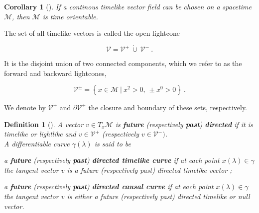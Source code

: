 \documentclass[11pt]{book}
\newcommand{\Mcal}{\mathcal{M}}
\newcommand{\Vcal}{\mathcal{V}}
\theoremstyle{break}
\newtheorem{corollary}{Corollary}
\newtheorem{definition}{Definition}
\begin{document}
\begin{corollary}[]
If a continous timelike vector field can be chosen on a spacetime $\Mcal$, then $\Mcal$ is time orientable.
\end{corollary}

The set of all timelike vectors is called the open lightcone 

\begin{equation*}
 \Vcal=\Vcal^{+} \ \dot{\cup} \ \Vcal^{-} \ . 
\end{equation*}

It is the disjoint union of two connected components, which we refer to as the forward and backward lightcones, 

\begin{equation*}
\Vcal^{\pm}=\left\{ x\in\Mcal \ | \ x^{2}>0, \ \pm x^{0}>0 \right\} \ . 
\end{equation*}

We denote by $\overline{\Vcal^{\pm}}$ and $\partial\Vcal^{\pm}$ the closure and boundary of these sets, respectively. \par

\begin{definition}[]
A vector $v \in T_x\Mcal$ is \textbf{future} (respectively \textbf{past}) \textbf{directed} if it is timelike or lightlike and $v \in \Vcal^+$ (respectively $v \in \Vcal^-)$. \\[3pt]
A differentiable curve $\gamma(\lambda)$ is said to be 

\begin{description}
\item a \textbf{future} (respectively \textbf{past}) \textbf{directed timelike curve} if at each point $x(\lambda) \in \gamma$ the tangent vector $v$ is a future (respectively past) directed timelike vector ;
\item a \textbf{future} (respectively \textbf{past}) \textbf{directed causal curve} if at each point $x(\lambda) \in \gamma$ the tangent vector $v$ is either a future (respectively past) directed timelike or null vector. 
\end{description} 

\end{definition}
\end{document}
